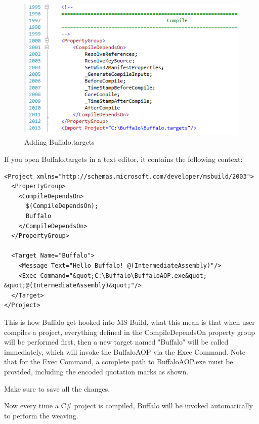 \begin{figure}[H]
  \includegraphics[scale=1.0]{CommonTarget.PNG}
  \centering
  \caption{Adding Buffalo.targets\label{buffalo_targets}}
\end{figure}

If you open Buffalo.targets in a text editor, it contains the following context:

\begin{lstlisting}[caption={Buffalo.targets}, label=buffalotargets, frame=tb, basicstyle=\scriptsize]
﻿<Project xmlns="http://schemas.microsoft.com/developer/msbuild/2003">
  <PropertyGroup>
    <CompileDependsOn>
      $(CompileDependsOn);
      Buffalo
    </CompileDependsOn>
  </PropertyGroup>

  <Target Name="Buffalo">
    <Message Text="Hello Buffalo! @(IntermediateAssembly)"/>
    <Exec Command="&quot;C:\Buffalo\BuffaloAOP.exe&quot; &quot;@(IntermediateAssembly)&quot;"/>
  </Target>
</Project>
\end{lstlisting}

This is how Buffalo get hooked into MS-Build, what this mean is that when user compiles a project, everything defined in the CompileDependsOn property group will be performed first, then a new target named "Buffalo" will be called immediately, which will invoke the BuffaloAOP via the Exec Command. Note that for the Exec Command, a complete path to BuffaloAOP.exe must be provided, including the encoded quotation marks as shown.

Make sure to save all the changes. 

Now every time a C\# project is compiled, Buffalo will be invoked automatically to perform the weaving.
